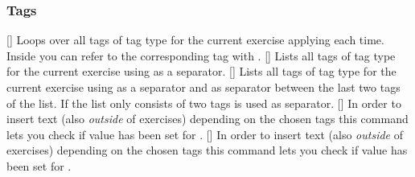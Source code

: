 \documentclass{xsim-manual}
\begin{document}
\subsubsection{Tags}
\begin{commands}
  []
    Loops over all tags of tag type  for the current exercise
    applying  each time.  Inside  you can refer to the
    corresponding tag with .
  []
    Lists all tags of tag type  for the current exercise using
     as a separator.
  []
    Lists all tags of tag type  for the current exercise using
     as a separator and  as separator
    between the last two tags of the list.  If the list only consists of two
    tags  is used as separator.
  []
    In order to insert text (also \emph{outside} of
    exercises) depending on the chosen tags this command lets you check if
    value  has been set for .
  []
    In order to insert text (also \emph{outside} of
    exercises) depending on the chosen tags this command lets you check if
    value  has been set for .
\end{commands}
\end{document}

